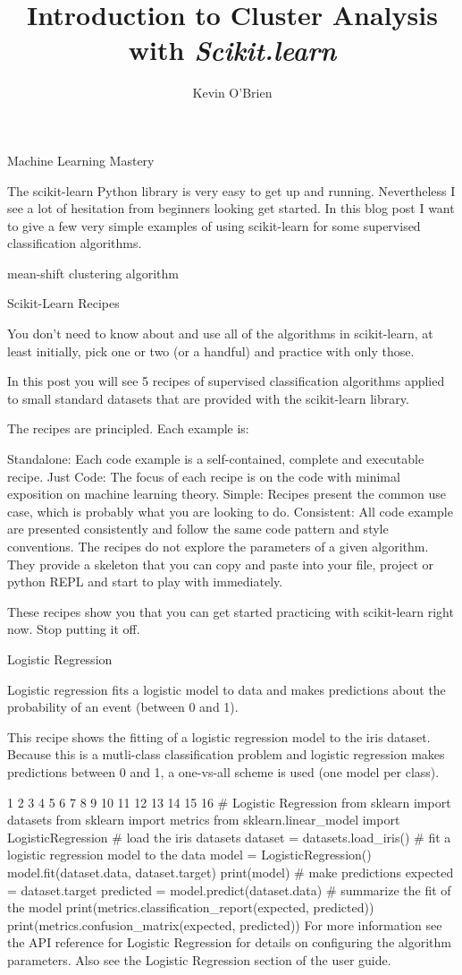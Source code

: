 \documentclass[12pt]{article}
\begin{document}
\author{Kevin O'Brien}
\title{Introduction to Cluster Analysis with \textbf{\textit{Scikit.learn}}}
\large
\tableofcontents
\newpage

Machine Learning Mastery


The scikit-learn Python library is very easy to get up and running. Nevertheless I see a lot of hesitation from beginners looking get started. In this blog post I want to give a few very simple examples of using scikit-learn for some supervised classification algorithms.

mean-shift clustering algorithm

Scikit-Learn Recipes

You don’t need to know about and use all of the algorithms in scikit-learn, at least initially, pick one or two (or a handful) and practice with only those.

In this post you will see 5 recipes of supervised classification algorithms applied to small standard datasets that are provided with the scikit-learn library.

The recipes are principled. Each example is:

Standalone: Each code example is a self-contained, complete and executable recipe.
Just Code: The focus of each recipe is on the code with minimal exposition on machine learning theory.
Simple: Recipes present the common use case, which is probably what you are looking to do.
Consistent: All code example are presented consistently and follow the same code pattern and style conventions.
The recipes do not explore the parameters of a given algorithm. They provide a skeleton that you can copy and paste into your file, project or python REPL and start to play with immediately.

These recipes show you that you can get started practicing with scikit-learn right now. Stop putting it off.

Logistic Regression

Logistic regression fits a logistic model to data and makes predictions about the probability of an event (between 0 and 1).

This recipe shows the fitting of a logistic regression model to the iris dataset. Because this is a mutli-class classification problem and logistic regression makes predictions between 0 and 1, a one-vs-all scheme is used (one model per class).


1
2
3
4
5
6
7
8
9
10
11
12
13
14
15
16
# Logistic Regression
from sklearn import datasets
from sklearn import metrics
from sklearn.linear_model import LogisticRegression
# load the iris datasets
dataset = datasets.load_iris()
# fit a logistic regression model to the data
model = LogisticRegression()
model.fit(dataset.data, dataset.target)
print(model)
# make predictions
expected = dataset.target
predicted = model.predict(dataset.data)
# summarize the fit of the model
print(metrics.classification_report(expected, predicted))
print(metrics.confusion_matrix(expected, predicted))
For more information see the API reference for Logistic Regression for details on configuring the algorithm parameters. Also see the Logistic Regression section of the user guide.
\end{document}
